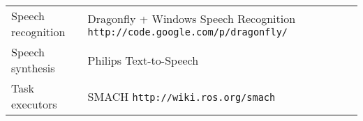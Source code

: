 \begin{table}[H]
\begin{center}
\begin{tabular}{p{} p{}}
            Speech recognition & Dragonfly + Windows Speech Recognition \newline
            \texttt{http://code.google.com/p/dragonfly/}\\
            Speech synthesis & Philips Text-to-Speech\\
            Task executors & SMACH \newline
            \texttt{http://wiki.ros.org/smach}\\
            \bottomrule
        \end{tabular}
    \end{center}
\end{table}
